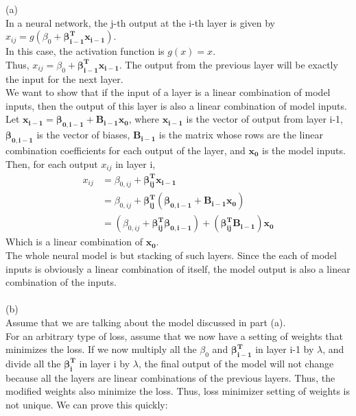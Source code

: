 \documentclass[11pt]{article}
\renewcommand{\vec}[1]{\mathbf{#1}}
\begin{document}
\begin{enumerate}
\begin{answertext}{20cm}{}
(a) \\
In a neural network, the j-th output at the i-th layer is given by $ x_{ij} = g(\beta_{0} + \vec{\beta^{T}_{i - 1}}\vec{x_{i-1}}) $. \\
In this case, the activation function is $ g(x) = x $. \\
Thus, $ x_{ij} = \beta_{0} + \vec{\beta^{T}_{i - 1}}\vec{x_{i-1}} $. The output from the previous layer will be exactly the input for the next layer. \\
We want to show that if the input of a layer is a linear combination of model inputs, then the output of this layer is also a linear combination of model inputs. \\
Let $ \vec{x_{i-1}} = \vec{\beta_{0,i-1}} + \vec{B_{i-1}}\vec{x_{0}} $, where $ \vec{x_{i-1}} $ is the vector of output from layer i-1,
$ \vec{\beta_{0,i-1}} $ is the vector of biases, $ \vec{B_{i-1}} $ is the matrix whose rows are the linear combination coefficients for each output of the layer,
and $ \vec{x_{0}} $ is the model inputs. \\
Then, for each output $ x_{ij} $ in layer i,
\begin{align*}
x_{ij} &= \beta_{0,ij} + \vec{\beta^{T}_{ij}}\vec{x_{i-1}} \\
&= \beta_{0,ij} + \vec{\beta^{T}_{ij}}(\vec{\beta_{0,i-1}} + \vec{B_{i-1}}\vec{x_{0}}) \\
&= (\beta_{0,ij} + \vec{\beta^{T}_{ij}}\vec{\beta_{0,i-1}}) + (\vec{\beta^{T}_{ij}}\vec{B_{i-1}})\vec{x_{0}}
\end{align*}
Which is a linear combination of $ \vec{x_{0}} $. \\
The whole neural model is but stacking of such layers. Since the each of model inputs is obviously a linear combination of itself, the model output is also a linear combination of the inputs. \\
\\
(b) \\
Assume that we are talking about the model discussed in part (a). \\
For an arbitrary type of loss, assume that we now have a setting of weights that minimizes the loss. If we now multiply all the $ \beta_{0} $ and $ \vec{\beta^{T}_{i-1}} $ in layer i-1 by $\lambda$, and divide all the $ \vec{\beta^{T}_{i}} $ in layer i by $\lambda$, the final output of the model will not change because all the layers are linear combinations of the previous layers. Thus, the modified weights also minimize the loss. Thus, loss minimizer setting of weights is not unique. We can prove this quickly: \\

\end{answertext}
\end{enumerate}
\end{document}
